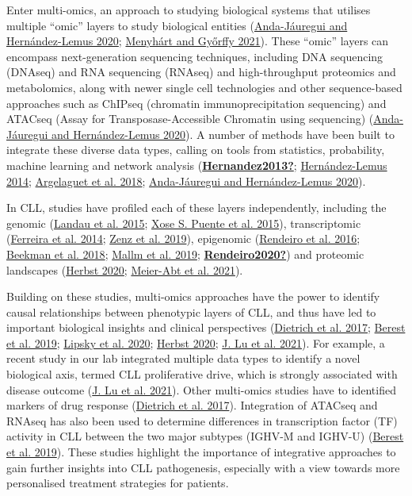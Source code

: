 \documentclass[11pt, a4paper, twosided]{book}
\begin{document}
Enter multi-omics, an approach to studying biological systems that utilises multiple ``omic'' layers to study biological entities (\protect\hyperlink{ref-Anda2020}{Anda-Jáuregui and Hernández-Lemus 2020}; \protect\hyperlink{ref-Menyhart2021}{Menyhárt and Győrffy 2021}). These ``omic'' layers can encompass next-generation sequencing techniques, including DNA sequencing (DNAseq) and RNA sequencing (RNAseq) and high-throughput proteomics and metabolomics, along with newer single cell technologies and other sequence-based approaches such as ChIPseq (chromatin immunoprecipitation sequencing) and ATACseq (Assay for Transposase-Accessible Chromatin using sequencing) (\protect\hyperlink{ref-Anda2020}{Anda-Jáuregui and Hernández-Lemus 2020}). A number of methods have been built to integrate these diverse data types, calling on tools from statistics, probability, machine learning and network analysis (\protect\hyperlink{ref-Hernandez2013}{\textbf{Hernandez2013?}}; \protect\hyperlink{ref-Hernandez2014}{Hernández-Lemus 2014}; \protect\hyperlink{ref-Argelaguet2018}{Argelaguet et al. 2018}; \protect\hyperlink{ref-Anda2020}{Anda-Jáuregui and Hernández-Lemus 2020}).

In CLL, studies have profiled each of these layers independently, including the genomic (\protect\hyperlink{ref-Landau2015}{Landau et al. 2015}; \protect\hyperlink{ref-Puente2015}{Xose S. Puente et al. 2015}), transcriptomic (\protect\hyperlink{ref-Ferreira2014}{Ferreira et al. 2014}; \protect\hyperlink{ref-Zenz2019}{Zenz et al. 2019}), epigenomic (\protect\hyperlink{ref-Rendeiro2016}{Rendeiro et al. 2016}; \protect\hyperlink{ref-Beekman2018}{Beekman et al. 2018}; \protect\hyperlink{ref-Mallm2019}{Mallm et al. 2019}; \protect\hyperlink{ref-Rendeiro2020}{\textbf{Rendeiro2020?}}) and proteomic landscapes (\protect\hyperlink{ref-HerbstThesis}{Herbst 2020}; \protect\hyperlink{ref-MeierAbt2021}{Meier-Abt et al. 2021}).

Building on these studies, multi-omics approaches have the power to identify causal relationships between phenotypic layers of CLL, and thus have led to important biological insights and clinical perspectives (\protect\hyperlink{ref-JCIpaper}{Dietrich et al. 2017}; \protect\hyperlink{ref-Berest2019}{Berest et al. 2019}; \protect\hyperlink{ref-Lipsky2020}{Lipsky et al. 2020}; \protect\hyperlink{ref-HerbstThesis}{Herbst 2020}; \protect\hyperlink{ref-Lu2021}{J. Lu et al. 2021}). For example, a recent study in our lab integrated multiple data types to identify a novel biological axis, termed CLL proliferative drive, which is strongly associated with disease outcome (\protect\hyperlink{ref-Lu2021}{J. Lu et al. 2021}). Other multi-omics studies have to identified markers of drug response (\protect\hyperlink{ref-JCIpaper}{Dietrich et al. 2017}). Integration of ATACseq and RNAseq has also been used to determine differences in transcription factor (TF) activity in CLL between the two major subtypes (IGHV-M and IGHV-U) (\protect\hyperlink{ref-Berest2019}{Berest et al. 2019}). These studies highlight the importance of integrative approaches to gain further insights into CLL pathogenesis, especially with a view towards more personalised treatment strategies for patients.
\end{document}
